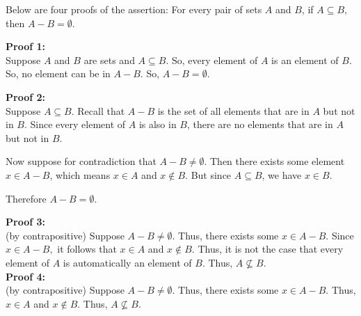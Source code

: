 \documentclass[12pt]{article}
\begin{document}
Below are four proofs of the assertion: For every pair of sets $A$ and $B$, if $A \subseteq B,$ then $A-B = \emptyset.$\\

\vfill

\textbf{Proof 1:}\\
Suppose $A$ and $B$ are sets and $A \subseteq B.$ So, every element of $A$ is an element of $B$. So, no element can be in $A-B.$ So, $A-B = \emptyset.$\\

\vfill

\textbf{Proof 2:}\\
Suppose $A \subseteq B$. Recall that $A - B$ is the set of all elements that are in $A$ but not in $B$. Since every element of $A$ is also in $B$, there are no elements that are in $A$ but not in $B$.

\medskip
Now suppose for contradiction that $A - B \neq \emptyset$. Then there exists some element $x \in A - B$, which means $x \in A$ and $x \notin B$. But since $A \subseteq B$, we have $x \in B$.

\medskip
Therefore $A - B = \emptyset$.\\

\vfill

\textbf{Proof 3:}\\
(by contrapositive) Suppose $A-B \not= \emptyset.$ Thus, there exists some $x \in A-B.$ Since $x \in A-B,$ it follows that $x \in A$ and $x \not \in B.$ Thus, it is not the case that every element of $A$ is automatically an element of $B.$ Thus, $A \not \subseteq B.$\\

\textbf{Proof 4:}\\
(by contrapositive) Suppose $A-B \not= \emptyset.$ Thus, there exists some $x \in A-B.$ Thus, $x \in A$ and $x \not \in B.$ Thus, $A \not \subseteq B.$\\
\end{document}
